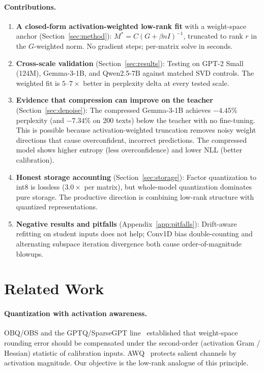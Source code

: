 \documentclass[11pt]{article}
\begin{document}
\paragraph{Contributions.}
\begin{enumerate}[leftmargin=1.5em]
  \item \textbf{A closed-form activation-weighted low-rank fit} with a
    weight-space anchor (Section~\ref{sec:method}):
    $M^{*} = C(G+\beta n I)^{-1}$, truncated to rank $r$ in the
    $G$-weighted norm. No gradient steps; per-matrix solve in seconds.
  \item \textbf{Cross-scale validation} (Section~\ref{sec:results}):
    Testing on GPT-2 Small (124M), Gemma-3-1B, and Qwen2.5-7B against
    matched SVD controls. The weighted fit is $5$--$7\times$ better in
    perplexity delta at every tested scale.
  \item \textbf{Evidence that compression can improve on the teacher}
    (Section~\ref{sec:denoise}): The compressed Gemma-3-1B achieves
    $-4.45\%$ perplexity (and $-7.34\%$ on 200 texts) below the teacher
    with no fine-tuning. This is possible because activation-weighted
    truncation removes noisy weight directions that cause overconfident,
    incorrect predictions. The compressed model shows higher entropy (less
    overconfidence) and lower NLL (better calibration).
  \item \textbf{Honest storage accounting} (Section~\ref{sec:storage}):
    Factor quantization to int8 is lossless ($3.0\times$ per matrix), but
    whole-model quantization dominates pure storage. The productive
    direction is combining low-rank structure with quantized
    representations.
  \item \textbf{Negative results and pitfalls} (Appendix~\ref{app:pitfalls}):
    Drift-aware refitting on student inputs does not help; Conv1D bias
    double-counting and alternating subspace iteration divergence both cause
    order-of-magnitude blowups.
\end{enumerate}

\section{Related Work}

\paragraph{Quantization with activation awareness.} OBQ/OBS and the
GPTQ/SparseGPT line~\cite{frantar2022gptq,frantar2023sparsegpt} established
that weight-space rounding error should be
compensated under the second-order (activation Gram / Hessian) statistic of
calibration inputs. AWQ~\cite{lin2023awq} protects salient channels by
activation magnitude.
Our objective is the low-rank analogue of this principle.
\end{document}
